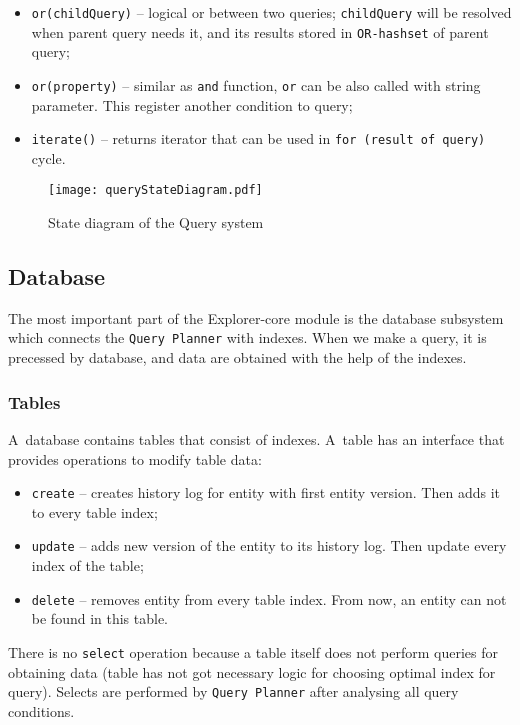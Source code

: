 \begin{itemize}
    \item \texttt{or(childQuery)} -- logical or between two queries; \texttt{childQuery} will be resolved when parent query needs it, and its results stored in \texttt{OR-hashset} of parent query;
    \item \texttt{or(property)} -- similar as \texttt{and} function, \texttt{or} can be also called with string parameter. This register another condition to query;
    \item \texttt{iterate()} -- returns iterator that can be used in \texttt{for (result of query)} cycle.
\end{itemize}


\begin{figure}[h]
    \centering
    \texttt{[image: queryStateDiagram.pdf]}
    \caption{State diagram of the Query system}
    \label{queryStateDiagram}
\end{figure}


\subsection{Database}
The most important part of the Explorer-core module is the database subsystem which connects the \texttt{Query Planner} with indexes. When we make a query, it is precessed by database, and data are obtained with the help of the indexes.

\subsubsection{Tables}
A~database contains tables that consist of indexes. A~table has an interface that provides operations to modify table data:
\begin{itemize}
    \item \texttt{create} -- creates history log for entity with first entity version. Then adds it to every table index;
    \item \texttt{update} -- adds new version of the entity to its history log. Then update every index of the table;
    \item \texttt{delete} -- removes entity from every table index. From now, an entity can not be found in this table.
\end{itemize}
There is no \texttt{select} operation because a table itself does not perform queries for obtaining data (table has not got necessary logic for choosing optimal index for query). Selects are performed by \texttt{Query Planner} after analysing all query conditions.

